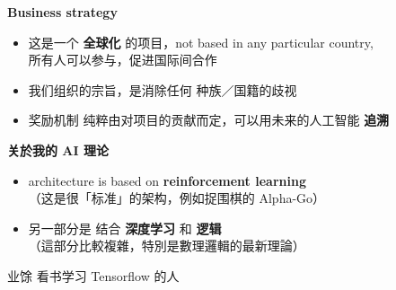 \documentclass[10pt]{beamer}
\newcommand{\emp}[1]{{\color{blue}\textbf{#1}}}
\newcommand{\smiley}{$\vcenter{\hbox{\texttt{[image: ../smiling-face.png]}}}$}
\begin{document}




\begin{frame}
\vspace*{2em}
{\color{blue} \Huge \textbf{Business strategy}}
\begin{itemize}
	\item 这是一个 \emp{全球化} 的项目，not based in any particular country, \\
			所有人可以参与，促进国际间合作
	
	\item 我们组织的宗旨，是消除任何 种族／国籍的歧视
	
	\item 奖励机制 纯粹由对项目的贡献而定，可以用未来的人工智能 \emp{追溯}
\end{itemize}
\end{frame}

\begin{frame}
\vspace*{2em}
{\color{blue} \Huge \textbf{关於我的 AI 理论}}
\begin{itemize}
	\item architecture is based on \emp{reinforcement learning} \\
			（这是很「标准」的架构，例如捉围棋的 Alpha-Go）
	
	\item 另一部分是 结合 \emp{深度学习} 和 \emp{逻辑} \\
			（這部分比較複雜，特別是數理邏輯的最新理論） 
\end{itemize}
\vspace*{1em}
{\small 业馀 看书学习 Tensorflow 的人}
\end{frame}
\end{document}
